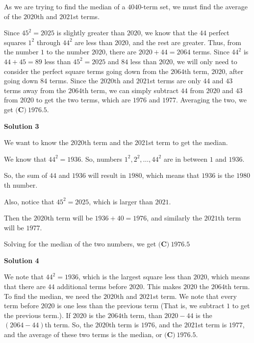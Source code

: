 \begin{enumerate}
As we are trying to find the median of a $4040$-term set, we must find the average of the $2020$th and $2021$st terms.

 Since $45^2 = 2025$ is slightly greater than $2020$, we know that the $44$ perfect squares $1^2$ through $44^2$ are less than $2020$, and the rest are greater. Thus, from the number $1$ to the number $2020$, there are $2020 + 44 = 2064$ terms. Since $44^2$ is $44 + 45 = 89$ less than $45^2 = 2025$ and $84$ less than $2020$, we will only need to consider the perfect square terms going down from the $2064$th term, $2020$, after going down $84$ terms. Since the $2020$th and $2021$st terms are only $44$ and $43$ terms away from the $2064$th term, we can simply subtract $44$ from $2020$ and $43$ from $2020$ to get the two terms, which are $1976$ and $1977$. Averaging the two, we get $\boxed{\textbf{(C)}\ 1976.5}.$




\textbf{Solution 3}

We want to know the $2020$th term and the $2021$st term to get the median.

 We know that $44^2=1936$. So, numbers $1^2, 2^2, \ldots,44^2$ are in between $1$ and $1936$.

 So, the sum of $44$ and $1936$ will result in $1980$, which means that $1936$ is the $1980$th number.

 Also, notice that $45^2=2025$, which is larger than $2021$.

 Then the $2020$th term will be $1936+40 = 1976$, and similarly the $2021$th term will be $1977$.

 Solving for the median of the two numbers, we get $\boxed{\textbf{(C)}\ 1976.5}$




\textbf{Solution 4}

We note that $44^2 = 1936$, which is the largest square less than $2020$, which means that there are $44$ additional terms before $2020$. This makes $2020$ the $2064$th term. To find the median, we need the $2020$th and $2021$st term. We note that every term before $2020$ is one less than the previous term (That is, we subtract $1$ to get the previous term.). If $2020$ is the $2064$th term, than $2020 - 44$ is the $(2064 - 44)$th term. So, the $2020$th term is $1976$, and the $2021$st term is $1977$, and the average of these two terms is the median, or $\boxed{\textbf{(C)}\ 1976.5}$.

 




\end{enumerate}
